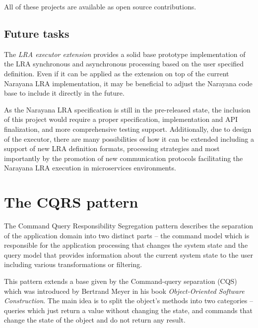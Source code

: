 \documentclass[oneside,
  digital, %
  table,   %
  lof,     %
  lot,     %
]{fithesis3}
\begin{document}
All of these projects are available as open source contributions.

\section{Future tasks}

The \textit{LRA executor extension} provides a solid base prototype implementation of the LRA synchronous and asynchronous processing based on the user specified definition. Even if it can be applied as the extension on top of the current Narayana LRA implementation, it may be beneficial to adjust the Narayana code base to include it directly in the future. 

As the Narayana LRA specification is still in the pre-released state, the inclusion of this project would require a proper specification, implementation and API finalization, and more comprehensive testing support. Additionally, due to design of the executor, there are many possibilities of how it can be extended including a support of new LRA definition formats, processing strategies and most importantly by the promotion of new communication protocols facilitating the Narayana LRA execution in microservices environments.

\makeatletter\thesis@blocks@clear\makeatother
{} %
\printindex




\appendix %

\clearpage
\chapter{The CQRS pattern}
\label{sec:appendix-cqrs}

The Command Query Responsibility Segregation pattern describes the separation of the application domain into two distinct parts -- the command model which is responsible for the application processing that changes the system state and the query model that provides information about the current system state to the user including various transformations or filtering. 

This pattern extends a base given by the Command-query separation (CQS) which was introduced by Bertrand Meyer in his book \textit{Object-Oriented Software Construction}. The main idea is to split the object's methods into two categories -- queries which just return a value without changing the state, and commands that change the state of the object and do not return any result.
\end{document}

